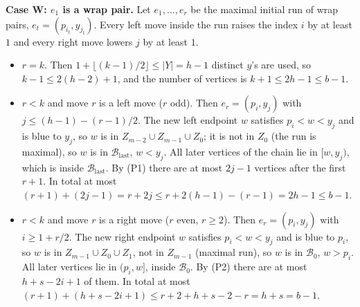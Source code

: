 \documentclass[11pt]{article}
\newcommand{\Bfirst}{\mathcal{B}_0}
\newcommand{\Blast}{\mathcal{B}_{\mathrm{last}}}
\theoremstyle{plain}
\theoremstyle{remark}
\begin{document}
\textbf{Case W: $e_1$ is a wrap pair.} Let $e_1, \dots, e_r$ be the maximal initial run of wrap pairs,
$e_t = (p_{i_t}, y_{j_t})$. Every left move inside the run raises the index $i$ by at least $1$ and every right
move lowers $j$ by at least $1$.
\begin{itemize}
  \item[W0:] $r = k$. Then $1 + \lfloor (k-1)/2 \rfloor \leq |Y| = h-1$ distinct $y$'s are used, so
  $k-1 \leq 2(h-2)+1$, and the number of vertices is $k+1 \leq 2h-1 \leq b-1$.
  \item[W1:] $r < k$ and move $r$ is a left move ($r$ odd). Then $e_r = (p_i, y_j)$ with
  $j \leq (h-1) - (r-1)/2$. The new left endpoint $w$ satisfies $p_i < w < y_j$ and is blue to $y_j$, so $w$ is in
  $Z_{m-2} \cup Z_{m-1} \cup Z_0$; it is not in $Z_0$ (the run is maximal), so $w$ is in $\Blast$, $w < y_j$. All
  later vertices of the chain lie in $[w, y_j)$, which is inside $\Blast$. By (P1) there are at most $2j-1$
  vertices after the first $r+1$. In total at most $(r+1) + (2j-1) = r + 2j \leq r + 2(h-1) - (r-1) = 2h-1 \leq b-1$.
  \item[W2:] $r < k$ and move $r$ is a right move ($r$ even, $r \geq 2$). Then $e_r = (p_i, y_j)$ with
  $i \geq 1 + r/2$. The new right endpoint $w$ satisfies $p_i < w < y_j$ and is blue to $p_i$, so $w$ is in
  $Z_{m-1} \cup Z_0 \cup Z_1$, not in $Z_{m-1}$ (maximal run), so $w$ is in $\Bfirst$, $w > p_i$. All later
  vertices lie in $(p_i, w]$, inside $\Bfirst$. By (P2) there are at most $h+s-2i+1$ of them. In total at most
  $(r+1) + (h+s-2i+1) \leq r + 2 + h + s - 2 - r = h + s = b-1$.
\end{itemize}
\end{document}
